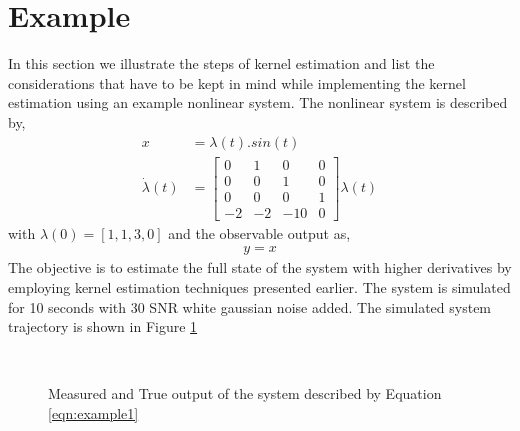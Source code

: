 \documentclass[letterpaper%
, twoside%
, 12pt%
,memoire%
, english%
,creativecommons,hyperref%
]{thETS}
\begin{document}
\section{Example}
In this section we illustrate the steps of kernel estimation and list the considerations that have to be kept in mind while implementing the kernel estimation using an example nonlinear system. The nonlinear system is described by, 
\begin{subequations} \label{eqn:example1}
\begin{align}
x &= \lambda(t) . sin(t)\\
\dot{\lambda}(t) &=  
\begin{bmatrix}
0  &  1  &   0   &  0  \\
0  &  0  &   1   &  0  \\
0  &  0  &   0   &  1  \\
-2 &  -2  &  -10 &  0  
\end{bmatrix} \lambda(t)
\end{align}
\end{subequations}
with $\lambda(0)=[1,1,3,0]$ and the observable output as, 
\begin{align*}
y = x
\end{align*}
The objective is to estimate the full state of the system with higher derivatives by employing kernel estimation techniques presented earlier. The system is simulated for 10 seconds with 30 SNR white gaussian noise added. The simulated system trajectory is shown in Figure \ref{Fig:outputs}
\begin{figure}[H]
	\centering
	 \\ \parbox{0.75\textwidth}{\caption{Measured and True output of the system described by Equation \eqref{eqn:example1}\label{Fig:outputs}}}
\end{figure}
\end{document}
